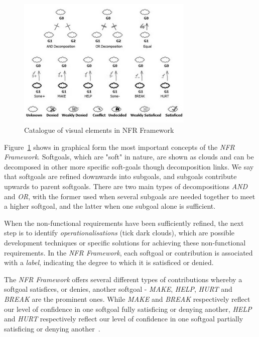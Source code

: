 \documentclass[dissertation,final]{softeng}
\begin{document}
\begin{figure}[h]
\includegraphics[width=0.75\textwidth]{SIGLegend}
\centering
\caption[Catalogue of visual elements in NFR Framework]{Catalogue of visual elements in NFR Framework~\footnotemark}
\label{fig:sig_legend}
\end{figure}

Figure~\ref{fig:sig_legend} shows in graphical form the most important concepts of the \emph{NFR Framework}. Softgoals, which are "soft" in nature, are shown as clouds and can be decomposed in other more specific soft-goals though decomposition links. We say that softgoals are refined downwards into subgoals, and subgoals contribute upwards to parent softgoals. There are two main types of decompositions \emph{AND} and \emph{OR}, with the former used when several subgoals are needed together to meet a higher softgoal, and the latter when one subgoal alone is sufficient. 

When the non-functional requirements have been sufficiently refined, the next step is to identify \emph{operationalisations} (tick dark clouds), which are possible development techniques or specific solutions for achieving these non-functional requirements. In the \emph{NFR Framework}, each softgoal or contribution is associated with a \emph{label}, indicating the degree to which it is satisficed or denied.

The \emph{NFR Framework} offers several different types of contributions whereby a softgoal satisfices, or denies, another softgoal - \emph{MAKE}, \emph{HELP}, \emph{HURT} and \emph{BREAK} are the prominent ones. While \emph{MAKE} and \emph{BREAK} respectively reflect our level of confidence in one softgoal fully satisficing or denying another, \emph{HELP} and \emph{HURT} respectively reflect our level of confidence in one softgoal partially satisficing or denying another~\citep{Chung:2009vg}. 
\end{document}
